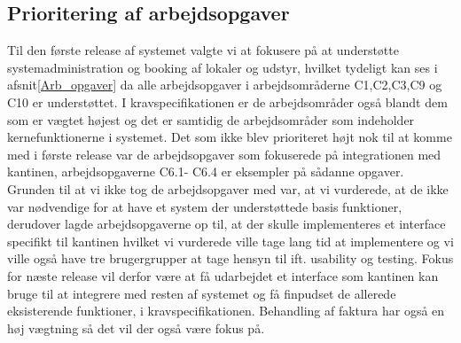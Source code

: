 \subsection{Prioritering af arbejdsopgaver}
\label{Baggrund_Arb_opgaver_Prio_Arb_Opg}
Til den første release af systemet valgte vi at fokusere på at understøtte systemadministration og booking af lokaler og udstyr, hvilket tydeligt kan ses i afsnit\ref{Arb_opgaver} da alle arbejdsopgaver i arbejdsområderne C1,C2,C3,C9 og C10 er understøttet. I kravspecifikationen er de arbejdsområder også blandt dem som er vægtet højest og det er samtidig de arbejdsområder som indeholder kernefunktionerne i systemet. Det som ikke blev prioriteret højt nok til at komme med i første release var de arbejdsopgaver som fokuserede på integrationen med kantinen, arbejdsopgaverne C6.1- C6.4 er eksempler på sådanne opgaver.
\\Grunden til at vi ikke tog de arbejdsopgaver med var, at vi vurderede, at de ikke var nødvendige for at have et system der understøttede basis funktioner, derudover lagde arbejdsopgaverne op til, at der skulle implementeres et interface specifikt til kantinen hvilket vi vurderede ville tage lang tid at implementere og vi ville også have tre brugergrupper at tage hensyn til ift. usability og testing.
Fokus for næste release vil derfor være at få udarbejdet et interface som kantinen kan bruge til at integrere med resten af systemet og få finpudset de allerede eksisterende funktioner, i kravspecifikationen. Behandling af faktura har også en høj vægtning så det vil der også være fokus på. 